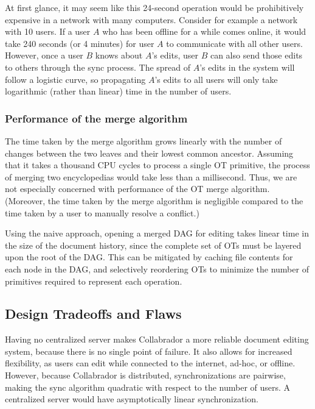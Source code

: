 \documentclass[11pt,titlepage]{article}
\begin{document}
At first glance, it may seem like this 24-second operation would be
prohibitively expensive in a network with many computers. Consider for
example a network with 10 users. If a user $A$ who has been offline
for a while comes online, it would take 240 seconds (or 4 minutes) for
user $A$ to communicate with all other users. However, once a user $B$
knows about $A$'s edits, user $B$ can also send those edits to others
through the sync process. The spread of $A$'s edits in the system will
follow a logistic curve, so propagating $A$'s edits to all users will
only take logarithmic (rather than linear) time in the number of
users.

\subsubsection{Performance of the merge algorithm}

The time taken by the merge algorithm grows linearly with the number
of changes between the two leaves and their lowest common ancestor.
Assuming that it takes a thousand CPU cycles to process a single OT
primitive, the process of merging two encyclopedias would take less
than a millisecond.  Thus, we are not especially concerned with
performance of the OT merge algorithm.  (Moreover, the time taken by
the merge algorithm is negligible compared to the time taken by a user
to manually resolve a conflict.)

Using the naive approach, opening a merged DAG for editing takes
linear time in the size of the document history, since the complete
set of OTs must be layered upon the root of the DAG.  This can be
mitigated by caching file contents for each node in the DAG, and
selectively reordering OTs to minimize the number of primitives
required to represent each operation.

\subsection{Design Tradeoffs and Flaws}

Having no centralized server makes Collabrador a more reliable
document editing system, because there is no single point of
failure. It also allows for increased flexibility, as users can edit
while connected to the internet, ad-hoc, or offline. However, because
Collabrador is distributed, synchronizations are pairwise, making the
sync algorithm quadratic with respect to the number of users. A
centralized server would have asymptotically linear synchronization.
\end{document}

